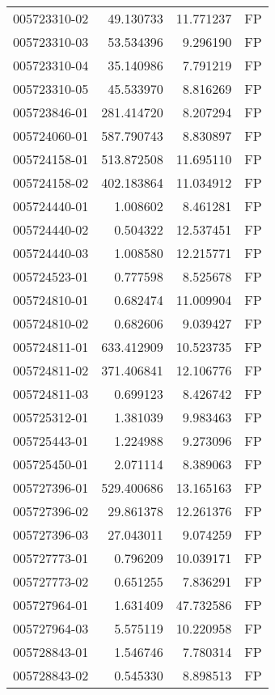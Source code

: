 \begin{tabular}{lrrl}
005723310-02 &   49.130733 &    11.771237 &   FP \\
005723310-03 &   53.534396 &     9.296190 &   FP \\
005723310-04 &   35.140986 &     7.791219 &   FP \\
005723310-05 &   45.533970 &     8.816269 &   FP \\
005723846-01 &  281.414720 &     8.207294 &   FP \\
005724060-01 &  587.790743 &     8.830897 &   FP \\
005724158-01 &  513.872508 &    11.695110 &   FP \\
005724158-02 &  402.183864 &    11.034912 &   FP \\
005724440-01 &    1.008602 &     8.461281 &   FP \\
005724440-02 &    0.504322 &    12.537451 &   FP \\
005724440-03 &    1.008580 &    12.215771 &   FP \\
005724523-01 &    0.777598 &     8.525678 &   FP \\
005724810-01 &    0.682474 &    11.009904 &   FP \\
005724810-02 &    0.682606 &     9.039427 &   FP \\
005724811-01 &  633.412909 &    10.523735 &   FP \\
005724811-02 &  371.406841 &    12.106776 &   FP \\
005724811-03 &    0.699123 &     8.426742 &   FP \\
005725312-01 &    1.381039 &     9.983463 &   FP \\
005725443-01 &    1.224988 &     9.273096 &   FP \\
005725450-01 &    2.071114 &     8.389063 &   FP \\
005727396-01 &  529.400686 &    13.165163 &   FP \\
005727396-02 &   29.861378 &    12.261376 &   FP \\
005727396-03 &   27.043011 &     9.074259 &   FP \\
005727773-01 &    0.796209 &    10.039171 &   FP \\
005727773-02 &    0.651255 &     7.836291 &   FP \\
005727964-01 &    1.631409 &    47.732586 &   FP \\
005727964-03 &    5.575119 &    10.220958 &   FP \\
005728843-01 &    1.546746 &     7.780314 &   FP \\
005728843-02 &    0.545330 &     8.898513 &   FP \\

\end{tabular}
